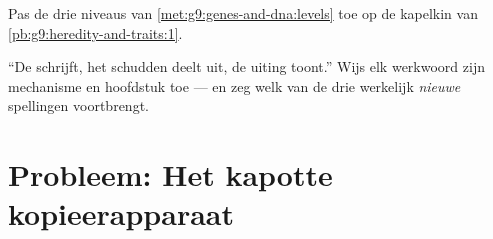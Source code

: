 \begin{exercise}[$\star\star$]\label{exo:g9:genes-and-dna:11}
Pas de drie niveaus van \cref{met:g9:genes-and-dna:levels} toe
op de kapelkin van \cref{pb:g9:heredity-and-traits:1}.
\end{exercise}

\begin{exercise}[$\star\star\star$]\label{exo:g9:genes-and-dna:12}
``De  schrijft, het schudden deelt uit, de uiting toont.''
Wijs elk werkwoord zijn mechanisme en hoofdstuk toe --- en zeg
welk van de drie werkelijk \emph{nieuwe} spellingen
voortbrengt.
\end{exercise}

\section{Probleem: Het kapotte kopieerapparaat}

